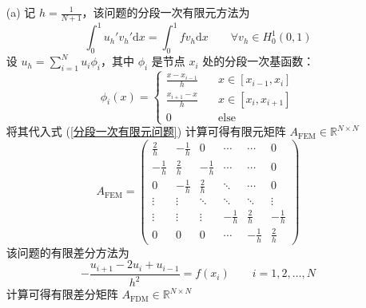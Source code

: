 \documentclass[a4paper]{article}
\begin{document}
\begin{enumerate}
    \item[(a)] 记 $h=\frac{1}{N+1}$，该问题的分段一次有限元方法为
            \begin{equation}
                \int_{0}^{1} u_h' v_h' \text{d}x = \int_{0}^{1} f v_h \text{d}x \qquad \forall v_h\in H_0^1(0,1)
                \label{分段一次有限元问题}
            \end{equation}
            设 $u_h=\sum_{i=1}^{N}u_i\phi_i$，其中 $\phi_i$ 是节点 $x_i$ 处的分段一次基函数：
            \begin{equation}
                \phi_i(x) = \begin{cases}
                    \displaystyle\frac{x-x_{i-1}}{h} \quad & x\in [x_{i-1}, x_i] \\
                    \displaystyle\frac{x_{i+1}-x}{h} & x\in [x_i, x_{i+1}] \\
                    0 & \text{else}
                \end{cases}
            \end{equation}
            将其代入式 (\ref{分段一次有限元问题}) 计算可得有限元矩阵
            $A_{\text{FEM}} \in \mathbb{R}^{N\times N}$
            \begin{equation}
                A_{\text{FEM}} =
                \begin{pmatrix}
                    \frac{2}{h} & -\frac{1}{h} & 0 & \cdots & \cdots & 0\\
                    -\frac{1}{h} & \frac{2}{h} & -\frac{1}{h} & \cdots & \cdots & 0\\
                    0 & -\frac{1}{h} & \frac{2}{h} & \ddots & \cdots & 0\\
                    \vdots & \vdots & \ddots & \ddots & \ddots & \vdots\\
                    \vdots & \vdots & \vdots & -\frac{1}{h} & \frac{2}{h} & -\frac{1}{h}\\
                    0 & 0 & 0 & \cdots & -\frac{1}{h} & \frac{2}{h}
                \end{pmatrix}
            \end{equation}
            该问题的有限差分方法为
            \begin{equation}
                -\frac{u_{i+1}-2u_i+u_{i-1}}{h^2} = f(x_i)
                \qquad i=1,2,\ldots,N
            \end{equation}
            计算可得有限差分矩阵
            $A_{\text{FDM}} \in \mathbb{R}^{N\times N}$
            \begin{equation}

\end{equation}
\end{enumerate}
\end{document}
